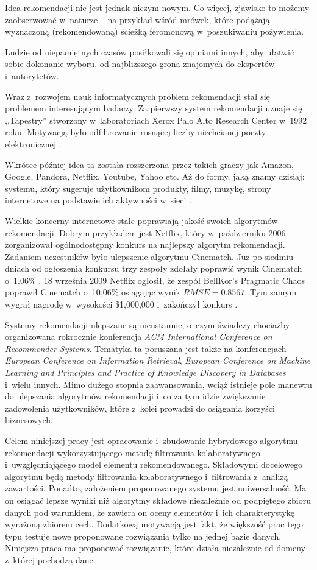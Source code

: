 \documentclass[twoside]{iisthesis}
\begin{document}
	 Idea rekomendacji nie jest jednak niczym nowym. Co więcej, zjawisko to możemy zaobserwować w~naturze -- na przykład wśród mrówek, które podążają wyznaczoną (rekomendowaną) ścieżką feromonową w~poszukiwaniu pożywienia.
	 
	 Ludzie od niepamiętnych czasów posiłkowali się opiniami innych, aby ułatwić sobie dokonanie wyboru, od najbliższego grona znajomych do ekspertów i~autorytetów.
	 
	 Wraz z~rozwojem nauk informatycznych problem rekomendacji stał się problemem interesującym badaczy. Za pierwszy system rekomendacji uznaje się ,,Tapestry'' stworzony w~laboratoriach Xerox Palo Alto Research Center w~1992 roku. Motywacją było odfiltrowanie rosnącej liczby niechcianej poczty elektronicznej \cite{id:FromTapestryToSVD}.
	 
	 Wkrótce później idea ta została rozszerzona przez takich graczy jak Amazon, Google, Pandora, Netflix, Youtube, Yahoo etc. Aż do formy, jaką znamy dzisiaj: systemu, który sugeruje użytkownikom produkty, filmy, muzykę, strony internetowe na podstawie ich aktywności w~sieci \cite{id:EvolutionOfRecommenderSystems}. 
	 
	 Wielkie koncerny internetowe stale poprawiają jakość swoich algorytmów rekomendacji. Dobrym przykładem jest Netflix, który w~październiku 2006 zorganizował ogólnodostępny konkurs na najlepszy algorytm rekomendacji. Zadaniem uczestników było ulepszenie algorytmu Cinematch. Już po siedmiu dniach od ogłoszenia konkursu trzy zespoły zdołały poprawić wynik Cinematch o~1.06\% \cite{id:NetflixPrize,id:NetflixPrizeRankings}. 18 września 2009 Netflix ogłosił, że zespół BellKor's Pragmatic Chaos poprawił Cinematch o~10,06\% osiągając wynik $RMSE = 0.8567$. Tym samym wygrał nagrodę w~wysokości \$1,000,000 i~zakończył konkurs \cite{id:NetflixPrize2,id:NetflixPrizeRules}.
	 
	 Systemy rekomendacji ulepszane są nieustannie, o~czym świadczy chociażby organizowana rokrocznie konferencja\textit{ ACM International Conference on Recommender Systems}. Tematyka ta poruszana jest także na konferencjach \textit{European Conference on Information Retrieval}, \textit{European Conference on Machine Learning and Principles and Practice of Knowledge Discovery in Databases} i~wielu innych. Mimo dużego stopnia zaawansowania, wciąż istnieje pole manewru do ulepszania algorytmów rekomendacji i~co za tym idzie zwiększanie zadowolenia użytkowników, które z~kolei prowadzi do osiągania korzyści biznesowych.
	 
	 Celem niniejszej pracy jest opracowanie i~zbudowanie hybrydowego algorytmu rekomendacji wykorzystującego metodę filtrowania kolaboratywnego i~uwzględniającego model elementu rekomendowanego. Składowymi docelowego algorytmu będą metody filtrowania kolaboratywnego i~filtrowania z~analizą zawartości. Ponadto, założeniem proponowanego systemu jest uniwersalność. Ma on osiągać lepsze wyniki niż algorytmy składowe niezależnie od podpiętego zbioru danych pod warunkiem, że zawiera on oceny elementów i~ich charakterystykę wyrażoną zbiorem cech. Dodatkową motywacją jest fakt, że większość prac tego typu testuje nowe proponowane rozwiązania tylko na jednej bazie danych. Niniejsza praca ma proponować rozwiązanie, które działa niezależnie od domeny z~której pochodzą dane.
	 
\end{document}
